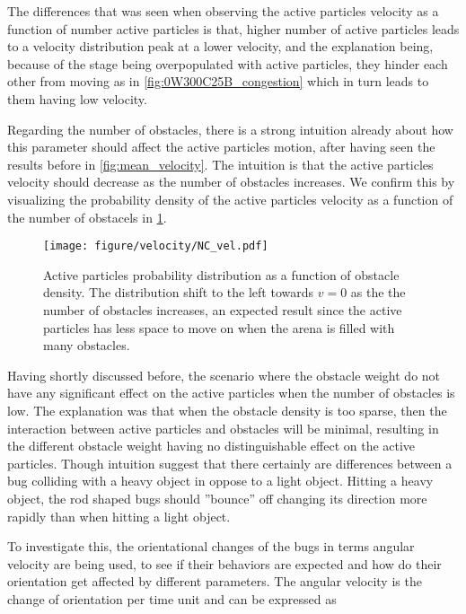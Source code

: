 The differences that was seen when observing the active 
particles velocity as a function of number active particles is that, 
higher number of active particles leads to a velocity 
distribution peak at a lower velocity, 
and the explanation being, because of the stage being 
overpopulated with active particles, they hinder each other 
from moving as in \cref{fig:0W300C25B_congestion} which in 
turn leads to them having low velocity.

Regarding the number of obstacles, there is a strong intuition 
already about how this parameter should affect the active 
particles motion, after having seen the results before in \cref{fig:mean_velocity}. 
The intuition is that the active particles velocity should 
decrease as the number of obstacles increases. 
We confirm this by visualizing the probability density of the active particles 
velocity as a function of the number of obstacels in \cref{fig:velkde_1WNC10B}.


\begin{figure}[htpb]
    \centering
    \texttt{[image: figure/velocity/NC\_vel.pdf]}
    \caption{Active particles probability distribution 
        as a function of obstacle density. 
	    The distribution shift to the left towards $v=0$ 
        as the the number of obstacles increases, 
	    an expected result since the active particles 
        has less space to move on when the arena 
	    is filled with many obstacles.
    }
    \label{fig:velkde_1WNC10B}
\end{figure}

Having shortly discussed before, the scenario where 
the obstacle weight do not have any significant 
effect on the active particles when the number of 
obstacles is low. The explanation was that when the 
obstacle density is too sparse, then the interaction 
between active particles and obstacles will be minimal, 
resulting in the different obstacle weight having no 
distinguishable effect on the active particles. 
Though intuition suggest that there certainly are 
differences between a bug colliding with a heavy object
in oppose to a light object. Hitting a heavy object, 
the rod shaped bugs should ''bounce'' off changing 
its direction more rapidly than when hitting a light object. 

To investigate this, the orientational changes of the 
bugs in terms angular velocity are being used, 
to see if their behaviors are expected and how do their 
orientation get affected by different parameters. 
The angular velocity is the change of orientation per 
time unit and can be expressed as

